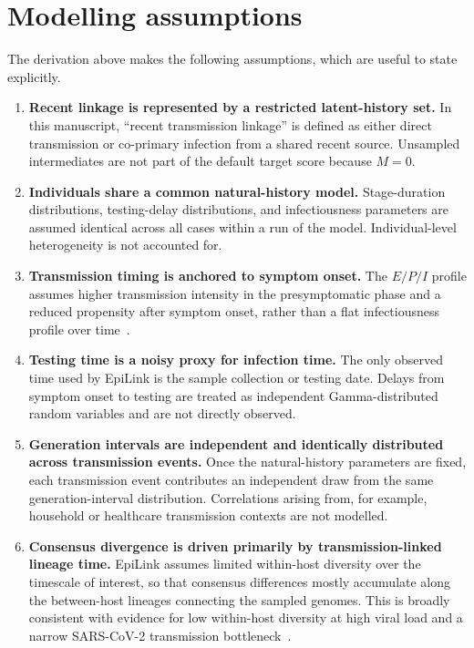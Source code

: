 \documentclass[11pt,a4paper]{article}
\begin{document}
\section{Modelling assumptions}
\label{sec:S1_assumptions}

The derivation above makes the following assumptions, which are useful to state explicitly.

\begin{enumerate}

\item \textbf{Recent linkage is represented by a restricted latent-history set.}
In this manuscript, ``recent transmission linkage'' is defined as either direct transmission or co-primary infection from a shared recent source. Unsampled intermediates are not part of the default target score because $M = 0$.

\item \textbf{Individuals share a common natural-history model.}
Stage-duration distributions, testing-delay distributions, and infectiousness parameters are assumed identical across all cases within a run of the model. Individual-level heterogeneity is not accounted for.

\item \textbf{Transmission timing is anchored to symptom onset.}
The $E/P/I$ profile assumes higher transmission intensity in the presymptomatic phase and a reduced propensity after symptom onset, rather than a flat infectiousness profile over time~\cite{Hart2021, He2020, Ferretti2020}.

\item \textbf{Testing time is a noisy proxy for infection time.}
The only observed time used by EpiLink is the sample collection or testing date. Delays from symptom onset to testing are treated as independent Gamma-distributed random variables and are not directly observed.

\item \textbf{Generation intervals are independent and identically distributed across transmission events.}
Once the natural-history parameters are fixed, each transmission event contributes an independent draw from the same generation-interval distribution. Correlations arising from, for example, household or healthcare transmission contexts are not modelled.

\item \textbf{Consensus divergence is driven primarily by transmission-linked lineage time.}
EpiLink assumes limited within-host diversity over the timescale of interest, so that consensus differences mostly accumulate along the between-host lineages connecting the sampled genomes. This is broadly consistent with evidence for low within-host diversity at high viral load and a narrow SARS-CoV-2 transmission bottleneck~\cite{Lythgoe2021}.


\end{enumerate}
\end{document}
